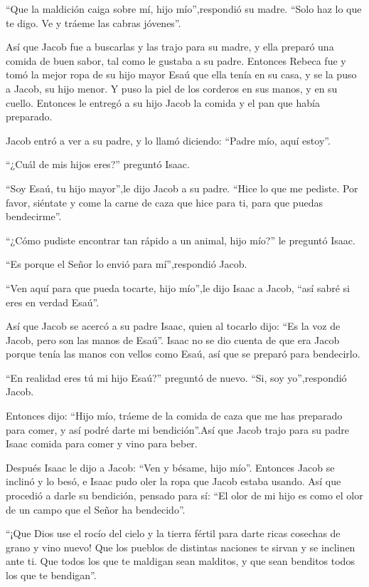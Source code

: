 ``Que la maldición caiga sobre mí, hijo mío'',respondió su
madre. ``Solo haz lo que te digo. Ve y tráeme las cabras jóvenes''.

 Así que Jacob fue a buscarlas y las trajo para su madre, y
ella preparó una comida de buen sabor, tal como le gustaba a su padre.
 Entonces Rebeca fue y tomó la mejor ropa de su hijo mayor
Esaú que ella tenía en su casa, y se la puso a Jacob, su hijo menor.
 Y puso la piel de los corderos en sus manos, y en su
cuello.  Entonces le entregó a su hijo Jacob la comida y el
pan que había preparado.

 Jacob entró a ver a su padre, y lo llamó diciendo: ``Padre
mío, aquí estoy''.

``¿Cuál de mis hijos eres?'' preguntó Isaac.

 ``Soy Esaú, tu hijo mayor'',le dijo Jacob a su padre.
``Hice lo que me pediste. Por favor, siéntate y come la carne de caza
que hice para ti, para que puedas bendecirme''.

 ``¿Cómo pudiste encontrar tan rápido a un animal, hijo
mío?'' le preguntó Isaac.

``Es porque el Señor lo envió para mí'',respondió Jacob.

 ``Ven aquí para que pueda tocarte, hijo mío'',le dijo
Isaac a Jacob, ``así sabré si eres en verdad Esaú''.

 Así que Jacob se acercó a su padre Isaac, quien al tocarlo
dijo: ``Es la voz de Jacob, pero son las manos de Esaú''. 
Isaac no se dio cuenta de que era Jacob porque tenía las manos con
vellos como Esaú, así que se preparó para bendecirlo.

 ``En realidad eres tú mi hijo Esaú?'' preguntó de nuevo.
``Si, soy yo'',respondió Jacob.

 Entonces dijo: ``Hijo mío, tráeme de la comida de caza que
me has preparado para comer, y así podré darte mi bendición''.Así que
Jacob trajo para su padre Isaac comida para comer y vino para beber.

 Después Isaac le dijo a Jacob: ``Ven y bésame, hijo mío''.
 Entonces Jacob se inclinó y lo besó, e Isaac pudo oler la
ropa que Jacob estaba usando. Así que procedió a darle su bendición,
pensado para sí: ``El olor de mi hijo es como el olor de un campo que el
Señor ha bendecido''.

 ``¡Que Dios use el rocío del cielo y la tierra fértil para
darte ricas cosechas de grano y vino nuevo!  Que los
pueblos de distintas naciones te sirvan y se inclinen ante ti. Que todos
los que te maldigan sean malditos, y que sean benditos todos los que te
bendigan''.

